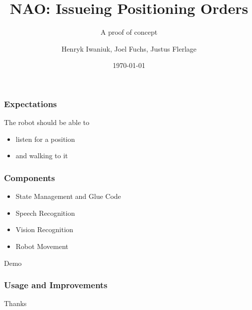 \documentclass{beamer}
\title{NAO: Issueing Positioning Orders}
\subtitle{A proof of concept}
\author{Henryk Iwaniuk, Joel Fuchs, Justus Flerlage}
\date{\today}
\institute{https://github.com/Teszko/nao\_project}
\begin{document}
\maketitle

\begin{frame}
  \frametitle{Expectations}
  \pause
  The robot should be able to
  \pause
  \begin{itemize}
  \item listen for a position 
    \pause
  \item and walking to it
  \end{itemize}
\end{frame}

\begin{frame}
  \frametitle{Components}
  \pause
  \begin{itemize}
  \item State Management and Glue Code
    \pause
  \item Speech Recognition
    \pause
  \item Vision Recognition
    \pause
  \item Robot Movement
  \end{itemize}
\end{frame}

\begin{frame}[c]
  \begin{center}
    \Huge Demo
  \end{center}
\end{frame}

\begin{frame}
  \frametitle{Usage and Improvements}
  \begin{itemize}
  \end{itemize}
\end{frame}

\begin{frame}[c]
  \begin{center}
    \Huge Thanks 
  \end{center}
\end{frame}
\end{document}
